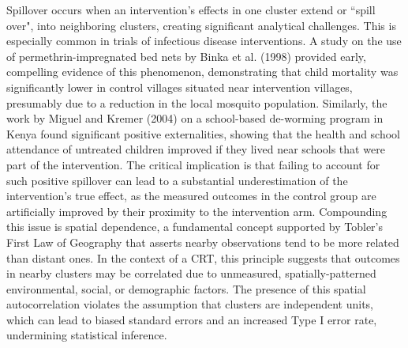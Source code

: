 \documentclass{article}[11pt]
\begin{document}
Spillover occurs when an intervention's effects in one cluster extend or ``spill over", into neighboring clusters, creating significant analytical challenges\cite{anayaizquierdo_spatial_2021}\cite{jarvis_spatial_2017}. This is especially common in trials of infectious disease interventions. A study on the use of permethrin-impregnated bed nets by Binka et al. (1998) provided early, compelling evidence of this phenomenon, demonstrating that child mortality was significantly lower in control villages situated near intervention villages, presumably due to a reduction in the local mosquito population\cite{binka_impact_1998}\cite{gimnig_effect_2003}\cite{hawley_community-wide_2003}. Similarly, the work by Miguel and Kremer (2004) on a school-based de-worming program in Kenya found significant positive externalities, showing that the health and school attendance of untreated children improved if they lived near schools that were part of the intervention\cite{miguel_worms_2004}. The critical implication is that failing to account for such positive spillover can lead to a substantial underestimation of the intervention's true effect, as the measured outcomes in the control group are artificially improved by their proximity to the intervention arm. Compounding this issue is spatial dependence, a fundamental concept supported by Tobler's First Law of Geography that asserts nearby observations tend to be more related than distant ones\cite{jarvis_spatial_2017}\cite{tobler_computer_1970}. In the context of a CRT, this principle suggests that outcomes in nearby clusters may be correlated due to unmeasured, spatially-patterned environmental, social, or demographic factors. The presence of this spatial autocorrelation violates the assumption that clusters are independent units, which can lead to biased standard errors and an increased Type I error rate, undermining statistical inference\cite{getis_history_2008}\cite{cressie_statistics_1993}\cite{tobler_computer_1970}.
\end{document}

